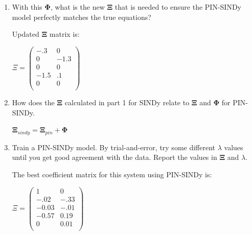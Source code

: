 \documentclass[11pt]{article}
\numberwithin{equation}{section}
\theoremstyle{plain}
\theoremstyle{definition}
\theoremstyle{remark}
\begin{document}
\begin{enumerate}
\centering
\begin{math}
\textbf{$\Phi$} = \begin{pmatrix}
1 & 0 \\
0 & -1 \\
0 & 0 \\
-1 & 0 \\
0 & 0 \\
\end{pmatrix}
\end{math}


\item With this $\bm{\Phi}$, what is the new $\bm{\Xi}$ that is needed to ensure the PIN-SINDy model perfectly matches the true equations?

\newline Updated $\bm{\Xi}$ matrix is: 

\centering
\begin{math}
\textbf{$\Xi$} = \begin{pmatrix}
-.3 & 0 \\
0 & -1.3 \\
0 & 0 \\
-1.5 & .1 \\
0 & 0 \\
\end{pmatrix}
\end{math}

\item How does the $\bm{\Xi}$ calculated in part 1 for SINDy relate to $\bm{\Xi}$ and $\bm{\Phi}$ for PIN-SINDy.

\newline $\bm{\Xi}_{sindy} =  \bm{\Xi}_{pin} + \bm{\Phi}$

\item Train a PIN-SINDy model. By trial-and-error, try some different $\lambda$ values until you get good agreement with the data. Report the values in $\bm{\Xi}$ and $\lambda$.

\newline The best coefficient matrix for this system using PIN-SINDy is: \newline

\centering
\begin{math}
\textbf{$\Xi$} = \begin{pmatrix}
1 & 0 \\
-.02 & -.33 \\
-0.03 & -.01 \\
-0.57 & 0.19\\
0 & 0.01 \\
\end{pmatrix}
\end{math}


\end{enumerate}
\end{document}
